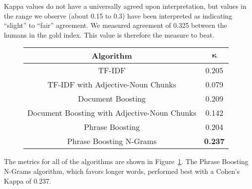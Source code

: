 Kappa values do not have a universally agreed upon interpretation, but
values in the range we observe (about 0.15 to 0.3) have been
interpreted as indicating ``slight'' to ``fair'' agreement. We measured
agreement of 0.325 between the humans in the gold index. This value is
therefore the measure to beat.


\begin{figure}[!ht]
\caption{}
\label{fig:main_result}
\begin{tabular}{|c|c|}
\hline
\textbf{Algorithm} & $\mathbf{\kappa}$ \\
\hline
TF-IDF & 0.205 \\
\hline
TF-IDF with Adjective-Noun Chunks & 0.079 \\
\hline
Document Boosting & 0.209 \\
\hline
Document Boosting with Adjective-Noun Chunks & 0.142 \\
\hline
Phrase Boosting & 0.204 \\
\hline
Phrase Boosting N-Grams & \textbf{0.237} \\
\hline
\end{tabular}
\end{figure}

The metrics for all of the algorithms are shown in
Figure~\ref{fig:main_result}. The Phrase Boosting N-Grams algorithm,
which favors longer words, performed best with a Cohen's Kappa of
0.237.

